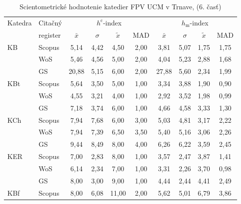 \begin{table}
  \centering\small
  \caption[Hodnotenie FPV\,--\,$h^{\mathrm{c}}$-index a $h_{\mathrm{m}}$-index]{Scientometrické hodnotenie katedier FPV UCM v Trnave, (6. časť)}
\label{tab:6-staff.results}
\begin{tabular}{llcccccccc}
  \toprule\noalign{\vspace{.3ex}}
  Katedra &Citačný  & \multicolumn{4}{c}{$h^{\mathrm{c}}$-index} & \multicolumn{4}{c}{$h_{\mathrm{m}}$-index} \\
      & register& $\bar{x}$      & $\sigma$  & $\tilde{x}$ & MAD  & $\bar{x}$      & $\sigma$  & $\tilde{x}$  & MAD  \\[0.3ex]
  \midrule\noalign{\vspace{.5ex}}                                                                                                                         
 KB   & Scopus & 5,14     & 4,42 & 4,50  & 2,00 & 3,81     & 5,07 & 1,75 & 1,75 \\
      & WoS    & 5,46     & 4,56 & 5,00  & 2,00 & 4,04     & 5,23 & 2,88 & 1,68 \\
      & GS     & 20,88    & 5,15 & 6,00  & 2,00 & 27,88    & 5,60 & 2,34 & 1,99 \\[1ex]
 KBt  & Scopus & 5,64     & 3,50 & 5,00  & 1,00 & 3,34     & 3,88 & 1,90 & 0,90 \\
      & WoS    & 4,55     & 3,21 & 4,00  & 1,00 & 2,92     & 3,52 & 1,98 & 0,99 \\
      & GS     & 7,18     & 3,74 & 6,00  & 1,00 & 4,66     & 4,58 & 3,33 & 1,30 \\[1ex]
 KCh  & Scopus & 7,94     & 7,68 & 6,00  & 3,00 & 5,03     & 4,81 & 3,17 & 2,22 \\
      & WoS    & 7,94     & 7,39 & 6,50  & 3,50 & 5,40     & 5,16 & 3,06 & 2,26 \\
      & GS     & 9,44     & 8,49 & 8,00  & 4,00 & 6,26     & 6,22 & 3,59 & 2,45 \\[1ex]
 KER  & Scopus & 7,00     & 2,83 & 8,00  & 1,00 & 3,57     & 2,47 & 3,87 & 1,41 \\
      & WoS    & 6,14     & 2,34 & 7,00  & 1,00 & 3,31     & 2,26 & 3,70 & 0,98 \\
      & GS     & 8,00     & 3,00 & 9,00  & 1,00 & 4,44     & 2,44 & 4,41 & 2,49 \\[1ex]
 KBf  & Scopus & 8,00     & 6,08 & 11,00 & 2,00 & 5,62     & 5,01 & 6,79 & 3,86 \\

\end{tabular}
\end{table}
